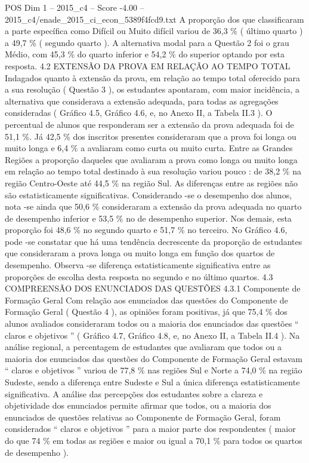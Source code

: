 \begin{textsample}{POS Dim 1 – 2015\_c4 – Score -4.00 – 2015\_c4/enade\_2015\_ci\_econ\_5389f4fcd9.txt}
A proporção dos que classificaram a parte específica como Difícil ou Muito difícil variou de 36,3 \% ( último quarto ) a 49,7 \% ( segundo quarto ).
A alternativa modal para a Questão 2 foi o grau Médio, com 45,3 \% do quarto inferior e 54,2 \% do superior optando por esta resposta. 4.2 EXTENSÃO DA PROVA EM RELAÇÃO AO TEMPO TOTAL Indagados quanto à extensão da prova, em relação ao tempo total oferecido para a sua resolução ( Questão 3 ), os estudantes apontaram, com maior incidência, a alternativa que considerava a extensão adequada, para todas as agregações consideradas ( Gráfico 4.5, Gráfico 4.6, e, no Anexo II, a Tabela II.3 ).
O percentual de alunos que responderam ser a extensão da prova adequada foi de 51,1 \%.
Já 42,5 \% dos inscritos presentes consideraram que a prova foi longa ou muito longa e 6,4 \% a avaliaram como curta ou muito curta.
Entre as Grandes Regiões a proporção daqueles que avaliaram a prova como longa ou muito longa em relação ao tempo total destinado à sua resolução variou pouco : de 38,2 \% na região Centro-Oeste até 44,5 \% na região Sul.
As diferenças entre as regiões não são estatisticamente significativas.
Considerando -se o desempenho dos alunos, nota -se ainda que 50,6 \% consideraram a extensão da prova adequada no quarto de desempenho inferior e 53,5 \% no de desempenho superior.
Nos demais, esta proporção foi 48,6 \% no segundo quarto e 51,7 \% no terceiro.
No Gráfico 4.6, pode -se constatar que há uma tendência decrescente da proporção de estudantes que consideraram a prova longa ou muito longa em função dos quartos de desempenho.
Observa -se diferença estatisticamente significativa entre as proporções de escolha desta resposta no segundo e no último quartos. 4.3 COMPREENSÃO DOS ENUNCIADOS DAS QUESTÕES 4.3.1 Componente de Formação Geral Com relação aos enunciados das questões do Componente de Formação Geral ( Questão 4 ), as opiniões foram positivas, já que 75,4 \% dos alunos avaliados consideraram todos ou a maioria dos enunciados das questões “ claros e objetivos ” ( Gráfico 4.7, Gráfico 4.8, e, no Anexo II, a Tabela II.4 ).
Na análise regional, a percentagem de estudantes que avaliaram que todos ou a maioria dos enunciados das questões do Componente de Formação Geral estavam “ claros e objetivos ” variou de 77,8 \% nas regiões Sul e Norte a 74,0 \% na região Sudeste, sendo a diferença entre Sudeste e Sul a única diferença estatisticamente significativa.
A análise das percepções dos estudantes sobre a clareza e objetividade dos enunciados permite afirmar que todos, ou a maioria dos enunciados de questões relativas ao Componente de Formação Geral, foram considerados “ claros e objetivos ” para a maior parte dos respondentes ( maior do que 74 \% em todas as regiões e maior ou igual a 70,1 \% para todos os quartos de desempenho ).

\end{textsample}
